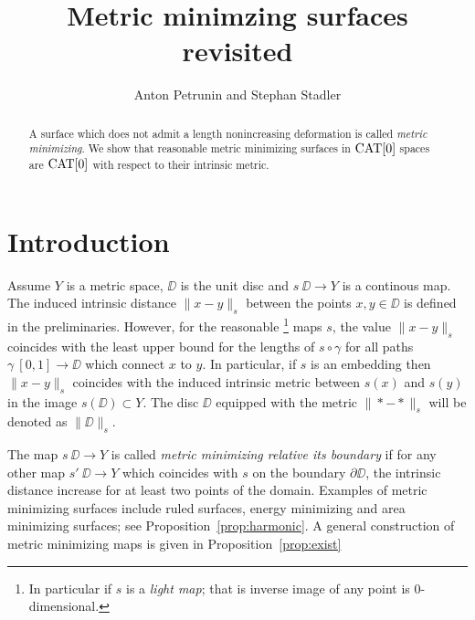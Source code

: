 \documentclass{article}
\begin{document}
\title{Metric minimzing surfaces revisited}
\author{Anton Petrunin and Stephan Stadler}


\date{}

\maketitle

\begin{abstract}
A surface which does not admit a length nonincreasing deformation is called \emph{metric minimizing}.
We show that reasonable metric minimizing surfaces in $\mathop{\rm CAT}\nolimits[0]$ spaces are $\mathop{\rm CAT}\nolimits[0]$ with respect to their intrinsic metric. 

\end{abstract}

\section{Introduction}


Assume $Y$ is a metric space, 
$\DD$ is the unit disc 
and $s\:\DD\to Y$ is a continous map.
The induced intrinsic distance $\|x-y\|_s$ between the points $x,y\in\DD$ is defined in the preliminaries.
However, 
for the reasonable%
\footnote{In particular if $s$ is a \emph{light map}; that is inverse image of any point is 0-dimensional.} 
maps $s$, 
the value $\|x-y\|_s$ coincides with the least upper bound for the lengths of $s\circ\gamma$ for all paths $\gamma\:[0,1]\to \DD$ which connect $x$ to $y$.
In particular, if $s$ is an embedding then $\|x-y\|_s$ coincides with the induced intrinsic metric between $s(x)$ and $s(y)$ in the image $s(\DD)\subset Y$.
The disc $\DD$ equipped with the metric $\|{*}-{*}\|_s$ will be denoted as $\|\DD\|_s$.

The map $s\:\DD\to Y$ is called \emph{metric minimizing relative its boundary} if for any other map $s'\:\DD\to Y$ which coincides with $s$ on the boundary $\partial \DD$, 
the intrinsic distance increase for at least two points of the domain.
Examples of metric minimizing surfaces include
ruled surfaces, energy minimizing and area minimizing surfaces; 
see Proposition~\ref{prop:harmonic}.
A general construction of metric minimizing maps is given in Proposition~\ref{prop:exist}
\end{document}
